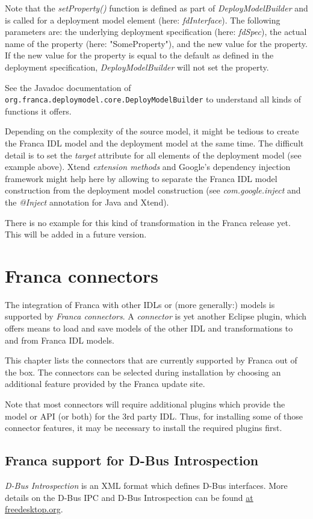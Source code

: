 \documentclass[a4paper,10pt]{scrreprt}
\begin{document}
Note that the \textit{setProperty()} function is defined as part of \textit{DeployModelBuilder}
and is called for a deployment model element (here: \textit{fdInterface}). The following
parameters are: the underlying deployment specification (here: \textit{fdSpec}), the
actual name of the property (here: "SomeProperty"), and the new value for the property.
If the new value for the property is equal to the default as defined in the 
deployment specification, \textit{DeployModelBuilder} will not set the property. 

See the Javadoc documentation of \protect\lstinline�org.franca.deploymodel.core.DeployModelBuilder�
to understand all kinds of functions it offers.

Depending on the complexity of the source model, it might be tedious to create the
Franca IDL model and the deployment model at the same time. The difficult detail
is to set the \textit{target} attribute for all elements of the deployment model (see
example above).
Xtend \textit{extension methods} and Google's dependency injection framework might help
here by allowing to separate the Franca IDL model construction from the deployment
model construction (see \textit{com.google.inject} and the \textit{@Inject} annotation for
Java and Xtend).

There is no example for this kind of transformation in the Franca release yet.
This will be added in a future version.


\chapter{Franca connectors}
\label{FrancaConnectors}
The integration of Franca with other IDLs or (more generally:) models is
supported by \textit{Franca connectors}. A \textit{connector} is yet another Eclipse plugin,
which offers means to load and save models of the other IDL and transformations
to and from Franca IDL models.

This chapter lists the connectors that are currently supported by Franca out of the box.
The connectors can be selected during installation by choosing an additional feature
provided by the Franca update site.

Note that most connectors will require additional plugins which provide the model or API
(or both) for the 3rd party IDL. Thus, for installing some of those connector features,
it may be necessary to install the required plugins first.

\section{Franca support for D-Bus Introspection}
\label{FrancaConnectors_DBus}
\textit{D-Bus Introspection} is an XML format which defines D-Bus interfaces.
More details on the D-Bus IPC and D-Bus Introspection can be found
\href{http://www.freedesktop.org/wiki/Software/dbus}{at freedesktop.org}.
\end{document}
